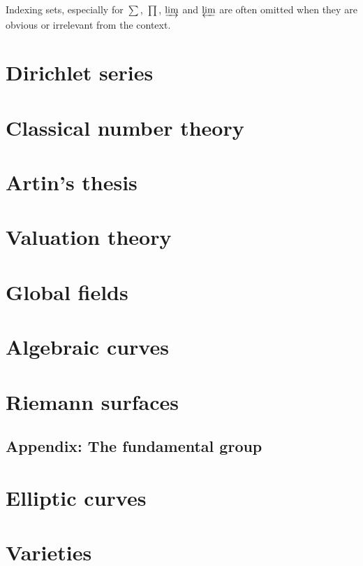 \documentclass[10pt]{article}
\theoremstyle{definition}
\begin{document}
Indexing sets, especially for $\sum$, $\prod$, $\varinjlim$ and $\varprojlim$ are often omitted when they are obvious or irrelevant from the context.



\section{Dirichlet series}
\label{ch:1}

\section{Classical number theory}
\label{ch:2}

\section{Artin's thesis}
\label{ch:3}

\section{Valuation theory}
\label{ch:4}

\section{Global fields}
\label{ch:5}

\section{Algebraic curves}
\label{ch:6}

\section{Riemann surfaces}
\label{ch:7}

\subsection{Appendix: The fundamental group}
\label{ch:7.8}

\section{Elliptic curves}
\label{ch:8}

\section{Varieties}
\label{ch:9}
\end{document}
